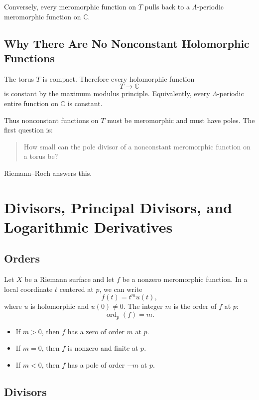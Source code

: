 \documentclass[11pt]{article}
\newcommand{\C}{\mathbb{C}}
\newcommand{\ord}{\operatorname{ord}}
\begin{document}
Conversely, every meromorphic function on \(T\) pulls back to a
\(\Lambda\)-periodic meromorphic function on \(\C\).

\subsection{Why There Are No Nonconstant Holomorphic Functions}

The torus \(T\) is compact.  Therefore every holomorphic function
\[
T\to\C
\]
is constant by the maximum modulus principle.  Equivalently, every
\(\Lambda\)-periodic entire function on \(\C\) is constant.

Thus nonconstant functions on \(T\) must be meromorphic and must have poles.
The first question is:

\begin{quote}
How small can the pole divisor of a nonconstant meromorphic function on a
torus be?
\end{quote}

Riemann--Roch answers this.

\section{Divisors, Principal Divisors, and Logarithmic Derivatives}

\subsection{Orders}

Let \(X\) be a Riemann surface and let \(f\) be a nonzero meromorphic
function.  In a local coordinate \(t\) centered at \(p\), we can write
\[
f(t)=t^m u(t),
\]
where \(u\) is holomorphic and \(u(0)\neq0\).  The integer \(m\) is the order
of \(f\) at \(p\):
\[
\ord_p(f)=m.
\]

\begin{itemize}
\item If \(m>0\), then \(f\) has a zero of order \(m\) at \(p\).
\item If \(m=0\), then \(f\) is nonzero and finite at \(p\).
\item If \(m<0\), then \(f\) has a pole of order \(-m\) at \(p\).
\end{itemize}

\subsection{Divisors}
\end{document}

